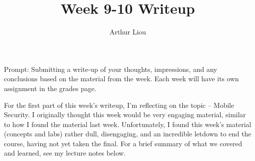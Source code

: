 \documentclass[12pt]{article}
\begin{document}
 
 
\title{Week 9-10 Writeup}
\author{Arthur Liou}

\maketitle

Prompt: Submitting a write-up of your thoughts, impressions, and any conclusions based on the material from the week. Each week will have its own assignment in the grades page.
\par

\linebreak
For the first part of this week’s writeup, I’m reflecting on the topic – Mobile Security. I originally thought this week would be very engaging material, similar to how I found the material last week. Unfortunately, I found this week’s material (concepts and labs) rather dull, disengaging, and an incredible letdown to end the course, having not yet taken the final. 
For a brief summary of what we covered and learned, see my lecture notes below.
\end{document}

